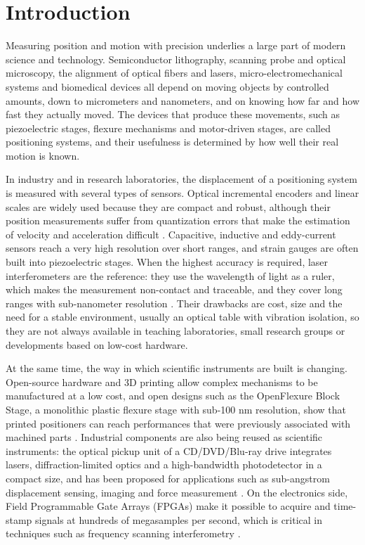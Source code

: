 \pagestyle{fancy}

\section*{Introduction}
Measuring position and motion with precision underlies a large part of modern science and technology. Semiconductor lithography, scanning probe and optical microscopy, the alignment of optical fibers and lasers, micro-electromechanical systems and biomedical devices all depend on moving objects by controlled amounts, down to micrometers and nanometers, and on knowing how far and how fast they actually moved. The devices that produce these movements, such as piezoelectric stages, flexure mechanisms and motor-driven stages, are called positioning systems, and their usefulness is determined by how well their real motion is known.

In industry and in research laboratories, the displacement of a positioning system is measured with several types of sensors. Optical incremental encoders and linear scales are widely used because they are compact and robust, although their position measurements suffer from quantization errors that make the estimation of velocity and acceleration difficult \cite{merryVelocityAccelerationEstimation2010}. Capacitive, inductive and eddy-current sensors reach a very high resolution over short ranges, and strain gauges are often built into piezoelectric stages. When the highest accuracy is required, laser interferometers are the reference: they use the wavelength of light as a ruler, which makes the measurement non-contact and traceable, and they cover long ranges with sub-nanometer resolution \cite{pedrottiIntroductionOptics2007}. Their drawbacks are cost, size and the need for a stable environment, usually an optical table with vibration isolation, so they are not always available in teaching laboratories, small research groups or developments based on low-cost hardware.

At the same time, the way in which scientific instruments are built is changing. Open-source hardware and 3D printing allow complex mechanisms to be manufactured at a low cost, and open designs such as the OpenFlexure Block Stage, a monolithic plastic flexure stage with sub-100 nm resolution, show that printed positioners can reach performances that were previously associated with machined parts \cite{mengOpenFlexureBlockStage2020, liaoLowcostOpensourceXYZ2022}. Industrial components are also being reused as scientific instruments: the optical pickup unit of a CD/DVD/Blu-ray drive integrates lasers, diffraction-limited optics and a high-bandwidth photodetector in a compact size, and has been proposed for applications such as sub-angstrom displacement sensing, imaging and force measurement \cite{hwuHackingCDDVD2018, hwuMeasurementCantileverDisplacement2006, changOpensourceForceAnalyzer2022}. On the electronics side, Field Programmable Gate Arrays (FPGAs) make it possible to acquire and time-stamp signals at hundreds of megasamples per second, which is critical in techniques such as frequency scanning interferometry \cite{sivanathanDesignFPGABasedHighSpeed2024, knollRadiationDetectionMeasurement2010}.

